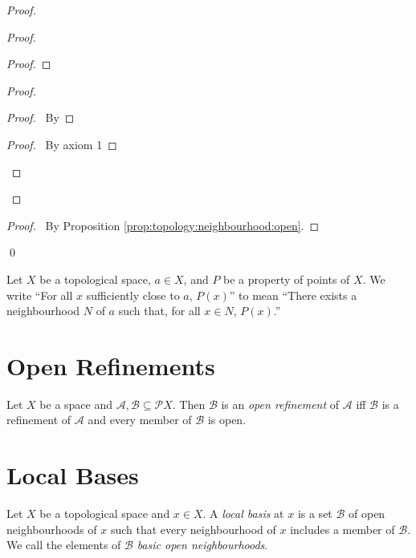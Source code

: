 \begin{proof}
\begin{proof}
\begin{proof}
    \end{proof}
    \begin{proof}
      \begin{proof}
        \pf\ By 
      \end{proof}
      \begin{proof}
        \pf\ By axiom 1
      \end{proof}
    \end{proof}
  \end{proof}
  \begin{proof}
    \pf\ By Proposition \ref{prop:topology:neighbourhood:open}.
  \end{proof}
  \qed
\end{proof}

\begin{df}
  Let $X$ be a topological space, $a \in X$, and $P$ be a property of points
  of $X$. We write ``For all $x$ sufficiently close to $a$, $P(x)$'' to mean
  ``There exists a neighbourhood $N$ of $a$ such that, for all $x \in N$,
  $P(x)$.''
\end{df}

\section{Open Refinements}

\begin{df}
  Let $X$ be a space and $\mathcal{A}, \mathcal{B} \subseteq \mathcal{P} X$. Then $\mathcal{B}$ is an \emph{open refinement} of $\mathcal{A}$ iff $\mathcal{B}$ is a refinement of $\mathcal{A}$ and every member of $\mathcal{B}$ is open.
\end{df}

\section{Local Bases}

\begin{df}
  Let $X$ be a topological space and $x \in X$. A \emph{local basis} at $x$
  is a set $\mathcal{B}$ of open neighbourhoods of $x$ such that every
  neighbourhood of $x$ includes a member of $\mathcal{B}$. We call the
  elements of $\mathcal{B}$ \emph{basic open neighbourhoods}.
\end{df}

